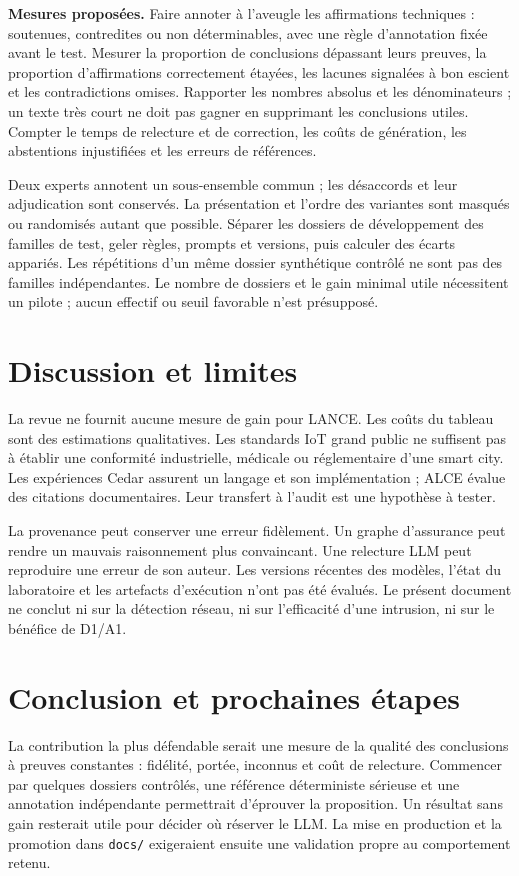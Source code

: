 \documentclass[11pt,a4paper]{article}
\begin{document}
\textbf{Mesures proposées.} Faire annoter à l'aveugle les affirmations techniques : soutenues, contredites ou non déterminables, avec une règle d'annotation fixée avant le test. Mesurer la proportion de conclusions dépassant leurs preuves, la proportion d'affirmations correctement étayées, les lacunes signalées à bon escient et les contradictions omises. Rapporter les nombres absolus et les dénominateurs ; un texte très court ne doit pas gagner en supprimant les conclusions utiles. Compter le temps de relecture et de correction, les coûts de génération, les abstentions injustifiées et les erreurs de références.

Deux experts annotent un sous-ensemble commun ; les désaccords et leur adjudication sont conservés. La présentation et l'ordre des variantes sont masqués ou randomisés autant que possible. Séparer les dossiers de développement des familles de test, geler règles, prompts et versions, puis calculer des écarts appariés. Les répétitions d'un même dossier synthétique contrôlé ne sont pas des familles indépendantes. Le nombre de dossiers et le gain minimal utile nécessitent un pilote ; aucun effectif ou seuil favorable n'est présupposé.

\section{Discussion et limites}
La revue ne fournit aucune mesure de gain pour LANCE. Les coûts du tableau sont des estimations qualitatives. Les standards IoT grand public ne suffisent pas à établir une conformité industrielle, médicale ou réglementaire d'une smart city. Les expériences Cedar assurent un langage et son implémentation ; ALCE évalue des citations documentaires. Leur transfert à l'audit est une hypothèse à tester.

La provenance peut conserver une erreur fidèlement. Un graphe d'assurance peut rendre un mauvais raisonnement plus convaincant. Une relecture LLM peut reproduire une erreur de son auteur. Les versions récentes des modèles, l'état du laboratoire et les artefacts d'exécution n'ont pas été évalués. Le présent document ne conclut ni sur la détection réseau, ni sur l'efficacité d'une intrusion, ni sur le bénéfice de D1/A1.

\section{Conclusion et prochaines étapes}
La contribution la plus défendable serait une mesure de la qualité des conclusions à preuves constantes : fidélité, portée, inconnus et coût de relecture. Commencer par quelques dossiers contrôlés, une référence déterministe sérieuse et une annotation indépendante permettrait d'éprouver la proposition. Un résultat sans gain resterait utile pour décider où réserver le LLM. La mise en production et la promotion dans \texttt{docs/} exigeraient ensuite une validation propre au comportement retenu.
\end{document}
